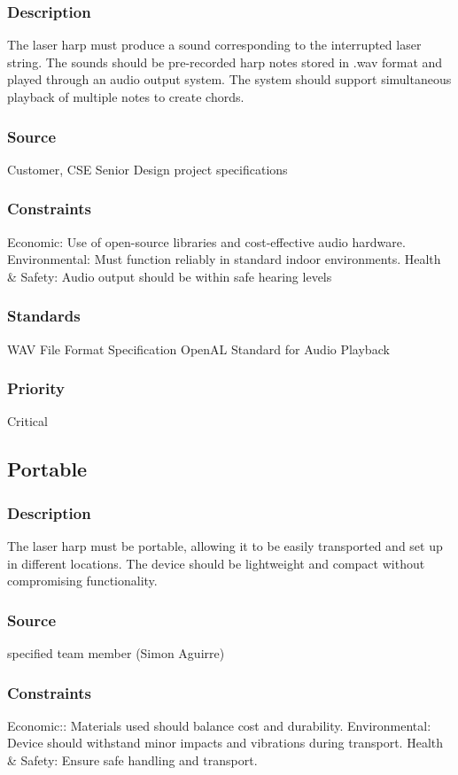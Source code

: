 \subsubsection{Description}
The laser harp must produce a sound corresponding to the interrupted laser string. The sounds should be pre-recorded harp notes stored in .wav format and played through an audio output system. The system should support simultaneous playback of multiple notes to create chords.
\subsubsection{Source}
Customer, CSE Senior Design project specifications
\subsubsection{Constraints}
Economic: Use of open-source libraries and cost-effective audio hardware.
Environmental: Must function reliably in standard indoor environments.
Health & Safety: Audio output should be within safe hearing levels
\subsubsection{Standards}
WAV File Format Specification
OpenAL Standard for Audio Playback
\subsubsection{Priority}
Critical


\subsection{Portable}
\subsubsection{Description}
The laser harp must be portable, allowing it to be easily transported and set up in different locations. The device should be lightweight and compact without compromising functionality.
\subsubsection{Source}
specified team member (Simon Aguirre)
\subsubsection{Constraints}
Economic:: Materials used should balance cost and durability.
Environmental: Device should withstand minor impacts and vibrations during transport.
Health & Safety: Ensure safe handling and transport.
